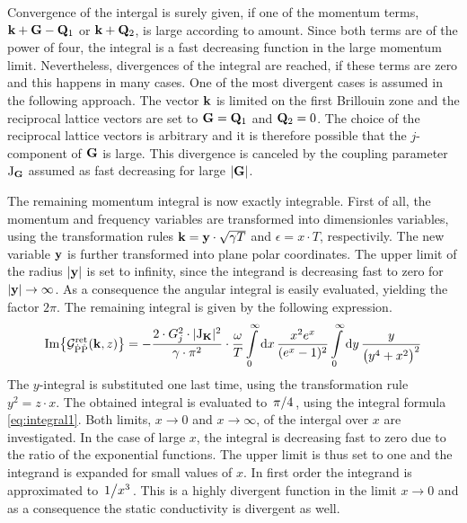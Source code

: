 %
%
%
%
Convergence of the intergal is surely given, if one of the momentum terms, $\vb{k}+\vb{G}-\vb{Q}_{1}$ or $\vb{k} + \vb{Q}_{2}$, is large according to amount.
Since both terms are of the power of four, the integral is a fast decreasing function in the large momentum limit.
Nevertheless, divergences of the integral are reached, if these terms are zero and this happens in many cases.
One of the most divergent cases is assumed in the following approach.
The vector $\vb{k}$ is limited on the first Brillouin zone and the reciprocal lattice vectors are set to $\vb{G} = \vb{Q}_{1}$ and $\vb{Q}_{2} = 0$.
The choice of the reciprocal lattice vectors is arbitrary and it is therefore possible that the $j$-component of $\vb{G}$ is large.
This divergence is canceled by the coupling parameter $\mathrm{J}_{\vb{G}}$ assumed as fast decreasing for large $|\vb{G}|$.

The remaining momentum integral is now exactly integrable.
First of all, the momentum and frequency variables are transformed into dimensionles variables, using the transformation rules $\vb{k} = \vb{y} \cdot \sqrt{\gamma T}$ and $\epsilon = x \cdot T$, respectivily.
The new variable $\vb{y}$ is further transformed into plane polar coordinates.
The upper limit of the radius $|\vb{y}|$ is set to infinity, since the integrand is decreasing fast to zero for $|\vb{y}| \to \infty$.
As a consequence the angular integral is easily evaluated, yielding the factor $2\pi$.
The remaining integral is given by the following expression.
%
\begin{align}
	\Im{\mathcal{G}_{\dot{\mathrm{P}}\dot{\mathrm{P}}}^{\mathrm{ret}}(\vb{k}, z)} = 
		 -\frac{2 \cdot G_{j}^{2} \cdot \vert \mathrm{J}_{\vb{K}} \vert^{2}}{\gamma \cdot \pi^{2}} \cdot \frac{\omega}{T}
		\int\limits_{0}^{\infty} \dd{x}
		\frac{x^{2} e^{x}}{(e^{x} - 1)^{2}}
		\int\limits_{0}^{\infty} \dd{y}
		\frac{y}{\big(y^{4} + x^{2}\big)^{2}}
\end{align}
%
The $y$-integral is substituted one last time, using the transformation rule $y^{2} = z \cdot x$.
The obtained integral is evaluated to $\flatfrac{\pi}{4}$, using the integral formula \eqref{eq:integral1}.
Both limits, $x \to 0$ and $x \to \infty$, of the intergal over $x$ are investigated.
In the case of large $x$, the integral is decreasing fast to zero due to the ratio of the exponential functions.
The upper limit is thus set to one and the integrand is expanded for small values of $x$.
In first order the integrand is approximated to $\flatfrac{1}{x^{3}}$.
This is a highly divergent function in the limit $x \to 0$ and as a consequence the static conductivity is divergent as well.

